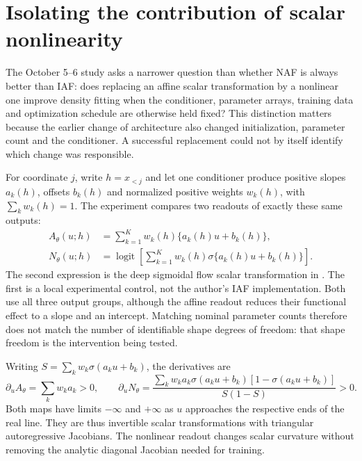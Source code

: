 \section[Isolating scalar nonlinearity]{Isolating the contribution of scalar nonlinearity}
\label{sec:neutra-scalar-nonlinearity-study}

The October 5--6 study asks a narrower question than whether NAF is always
better than IAF: does replacing an affine scalar transformation by a nonlinear
one improve density fitting when the conditioner, parameter arrays, training
data and optimization schedule are otherwise held fixed? This distinction
matters because the earlier change of architecture also changed initialization,
parameter count and the conditioner. A successful replacement could not by
itself identify which change was responsible.

For coordinate $j$, write $h=x_{<j}$ and let one conditioner produce positive
slopes $a_k(h)$, offsets $b_k(h)$ and normalized positive weights $w_k(h)$,
with $\sum_k w_k(h)=1$. The experiment compares two readouts of exactly these
same outputs:
\begin{align}
 A_\theta(u;h)&=\sum_{k=1}^K w_k(h)\{a_k(h)u+b_k(h)\},\\
 N_\theta(u;h)&=\operatorname{logit}\!\left[
        \sum_{k=1}^K w_k(h)\sigma\{a_k(h)u+b_k(h)\}\right].
 \label{eq:neutra-attribution-readouts}
\end{align}
The second expression is the deep sigmoidal flow scalar transformation in
\citet[Section~3.1, Eq.~(8)]{huang2018naf}. The first is a local experimental
control, not the author's IAF implementation. Both use all three output groups,
although the affine readout reduces their functional effect to a slope and an
intercept. Matching nominal parameter counts therefore does not match the
number of identifiable shape degrees of freedom: that shape freedom is the
intervention being tested.

Writing $S=\sum_k w_k\sigma(a_ku+b_k)$, the derivatives are
\begin{equation}
 \partial_u A_\theta=\sum_k w_ka_k>0,
 \qquad
 \partial_u N_\theta=
 \frac{\sum_k w_ka_k\sigma(a_ku+b_k)[1-\sigma(a_ku+b_k)]}{S(1-S)}>0.
\end{equation}
Both maps have limits $-\infty$ and $+\infty$ as $u$ approaches the respective
ends of the real line. They are thus invertible scalar transformations with
triangular autoregressive Jacobians. The nonlinear readout changes scalar
curvature without removing the analytic diagonal Jacobian needed for training.

